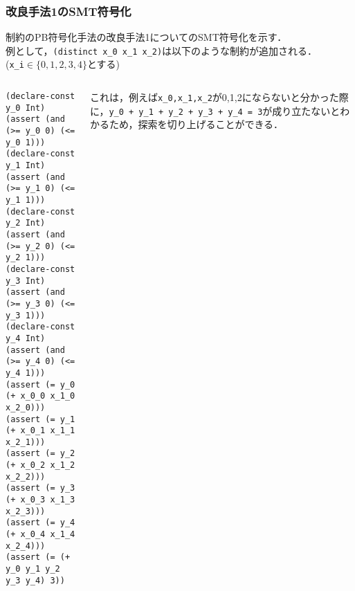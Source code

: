 


\begin{frame}[fragile]\footnotesize
    \frametitle{改良手法1のSMT符号化}
    \distinct 制約のPB符号化手法の改良手法1についてのSMT符号化を示す．\\
    例として，\verb|(distinct x_0 x_1 x_2)|は以下のような制約が追加される．\\
    (\verb|x_i|$\in \{0,1,2,3,4\}$とする)

    \begin{columns}
        \begin{column}{0.5\textwidth}
            \begin{exampleblock}{}\scriptsize
\begin{verbatim}
(declare-const y_0 Int)
(assert (and (>= y_0 0) (<= y_0 1)))
(declare-const y_1 Int)
(assert (and (>= y_1 0) (<= y_1 1)))
(declare-const y_2 Int)
(assert (and (>= y_2 0) (<= y_2 1)))
(declare-const y_3 Int)
(assert (and (>= y_3 0) (<= y_3 1)))
(declare-const y_4 Int)
(assert (and (>= y_4 0) (<= y_4 1)))
(assert (= y_0 (+ x_0_0 x_1_0 x_2_0)))
(assert (= y_1 (+ x_0_1 x_1_1 x_2_1)))
(assert (= y_2 (+ x_0_2 x_1_2 x_2_2)))
(assert (= y_3 (+ x_0_3 x_1_3 x_2_3)))
(assert (= y_4 (+ x_0_4 x_1_4 x_2_4)))
(assert (= (+ y_0 y_1 y_2 y_3 y_4) 3))
\end{verbatim}
            \end{exampleblock}
        \end{column}
        \begin{column}{0.5\textwidth}\scriptsize
            これは，例えば\verb|x_0,x_1,x_2|が0,1,2にならないと分かった際に，\verb|y_0 + y_1 + y_2 + y_3 + y_4 = 3|が成り立たないとわかるため，探索を切り上げることができる．
        \end{column}
    \end{columns}
\end{frame}



